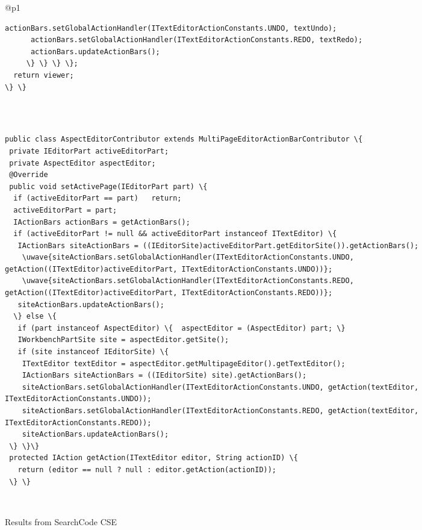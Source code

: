 \begin{figure*}[!htb]
\begin{minipage}{1\textwidth}
\begin{tabular}{@{}p{}}
\begin{Verbatim}[commandchars=\\\{\}, tabsize=2]
      actionBars.setGlobalActionHandler(ITextEditorActionConstants.UNDO, textUndo);
      actionBars.setGlobalActionHandler(ITextEditorActionConstants.REDO, textRedo);
      actionBars.updateActionBars();
     \} \} \} \};
  return viewer;
\} \}
 \end{Verbatim}
      \vspace{-4mm}
     \\ \hline
        \\ \hline
  \vspace{-4mm}
\begin{Verbatim}[commandchars=\\\{\}, tabsize=2]
public class AspectEditorContributor extends MultiPageEditorActionBarContributor \{
 private IEditorPart activeEditorPart;
 private AspectEditor aspectEditor;
 @Override
 public void setActivePage(IEditorPart part) \{
  if (activeEditorPart == part)   return;
  activeEditorPart = part;
  IActionBars actionBars = getActionBars();
  if (activeEditorPart != null && activeEditorPart instanceof ITextEditor) \{
   IActionBars siteActionBars = ((IEditorSite)activeEditorPart.getEditorSite()).getActionBars();
    \uwave{siteActionBars.setGlobalActionHandler(ITextEditorActionConstants.UNDO, getAction((ITextEditor)activeEditorPart, ITextEditorActionConstants.UNDO))};
    \uwave{siteActionBars.setGlobalActionHandler(ITextEditorActionConstants.REDO, getAction((ITextEditor)activeEditorPart, ITextEditorActionConstants.REDO))};
   siteActionBars.updateActionBars();              
  \} else \{
   if (part instanceof AspectEditor) \{  aspectEditor = (AspectEditor) part; \}
   IWorkbenchPartSite site = aspectEditor.getSite();
   if (site instanceof IEditorSite) \{
    ITextEditor textEditor = aspectEditor.getMultipageEditor().getTextEditor();
    IActionBars siteActionBars = ((IEditorSite) site).getActionBars();
    siteActionBars.setGlobalActionHandler(ITextEditorActionConstants.UNDO, getAction(textEditor, ITextEditorActionConstants.UNDO));
    siteActionBars.setGlobalActionHandler(ITextEditorActionConstants.REDO, getAction(textEditor, ITextEditorActionConstants.REDO));
    siteActionBars.updateActionBars();              
 \} \}\}
 protected IAction getAction(ITextEditor editor, String actionID) \{
   return (editor == null ? null : editor.getAction(actionID));
 \} \}
   \end{Verbatim}
      \vspace{-4mm}
     \\ \hline

\end{tabular} 
\caption{Results from SearchCode CSE}
\label{fig:undoEditor}
\end{minipage}
\end{figure*}

